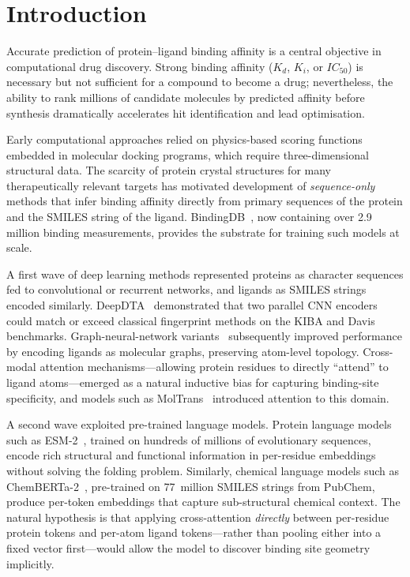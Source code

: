 \documentclass[11pt,twocolumn]{article}
\begin{document}
\section{Introduction}

Accurate prediction of protein--ligand binding affinity is a central
objective in computational drug discovery.  Strong binding affinity ($K_d$,
$K_i$, or $IC_{50}$) is necessary but not sufficient for a compound to
become a drug; nevertheless, the ability to rank millions of candidate
molecules by predicted affinity before synthesis dramatically accelerates
hit identification and lead optimisation.

Early computational approaches relied on physics-based scoring functions
embedded in molecular docking programs, which require three-dimensional
structural data.  The scarcity of protein crystal structures for many
therapeutically relevant targets has motivated development of
\emph{sequence-only} methods that infer binding affinity directly from
primary sequences of the protein and the SMILES string of the ligand.
BindingDB~\cite{liu2007bindingdb,gilson2016bindingdb,chen2024bindingdb2024},
now containing over 2.9 million binding measurements, provides the substrate
for training such models at scale.

A first wave of deep learning methods represented proteins as character
sequences fed to convolutional or recurrent networks, and ligands as SMILES
strings encoded similarly.  DeepDTA~\cite{ozturk2018deepdta} demonstrated
that two parallel CNN encoders could match or exceed classical fingerprint
methods on the KIBA and Davis benchmarks.  Graph-neural-network
variants~\cite{nguyen2021graphdta} subsequently improved performance by
encoding ligands as molecular graphs, preserving atom-level topology.
Cross-modal attention mechanisms---allowing protein residues to directly
``attend'' to ligand atoms---emerged as a natural inductive bias for capturing
binding-site specificity, and models such as
MolTrans~\cite{huang2021moltrans} introduced attention to this domain.

A second wave exploited pre-trained language models.  Protein language models
such as ESM-2~\cite{lin2023esm2}, trained on hundreds of millions of
evolutionary sequences, encode rich structural and functional information in
per-residue embeddings without solving the folding problem.  Similarly,
chemical language models such as ChemBERTa-2~\cite{ahmad2022chemberta2},
pre-trained on 77~million SMILES strings from PubChem, produce per-token
embeddings that capture sub-structural chemical context.  The natural
hypothesis is that applying cross-attention \emph{directly} between
per-residue protein tokens and per-atom ligand tokens---rather than pooling
either into a fixed vector first---would allow the model to discover binding
site geometry implicitly.
\end{document}
